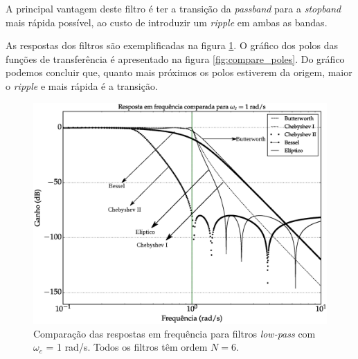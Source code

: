 A principal vantagem deste filtro é ter a transição da \textit{passband} para a \textit{stopband} mais rápida possível, ao custo de introduzir um \textit{ripple} em ambas as bandas.

As respostas dos filtros são exemplificadas na figura \ref{fig:compare_freqs}. O gráfico dos polos das funções de transferência é apresentado na figura \ref{fig:compare_poles}. Do gráfico podemos concluir que, quanto mais próximos os polos estiverem da origem, maior o \textit{ripple} e mais rápida é a transição. 

\begin{figure}[H]
\centering
\includegraphics[scale=0.58]{images/plots/compare_frequencies}
\caption{Comparação das respostas em frequência para filtros \textit{low-pass} com $\omega_c$ = 1 rad/s. Todos os filtros têm ordem $N = 6$.}
\label{fig:compare_freqs}
\end{figure}


